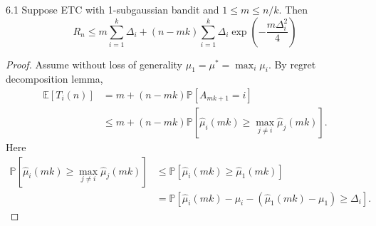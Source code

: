 \documentclass[10pt]{article}
\newenvironment{theorem*}[1]{%
  \IfBlankTF{#1}
    {\renewcommand{\themanualtheoreminner}{\unskip}}
    {\renewcommand\themanualtheoreminner{#1}}%
  \manualtheoreminner
}{\endmanualtheoreminner}
\theoremstyle{definition}
\begin{document}
\begin{theorem*}{6.1}
    Suppose ETC with 1-subgaussian bandit and $1 \leq m \leq n/k$.
    Then
    \begin{equation*}
        R_n \leq m \sum_{i=1}^{k} \Delta_i + (n-mk)\sum_{i=1}^{k} \Delta_i \exp\left(-\frac{m \Delta_i^2}{4}\right)
    \end{equation*}
\end{theorem*}

\begin{proof}
    Assume without loss of generality $\mu_1 = \mu^* = \max_i \mu_i$. By regret decomposition lemma,
    \begin{align*}
        \mathbb{E}[T_i (n)] &= m+ (n-mk) \mathbb{P}[A_{mk+1} = i] \\
        &\leq m+(n-mk)\mathbb{P}\left[\hat{\mu}_i (mk) \geq \max_{j \neq i} \hat{\mu}_j (mk) \right].
    \end{align*}
    Here
    \begin{align*}
        \mathbb{P}\left[\hat{\mu}_i (mk) \geq \max_{j \neq i} \hat{\mu}_j (mk) \right] &\leq \mathbb{P} \left[\hat{\mu}_i (mk) \geq \hat{\mu}_1(mk)\right] \\
        &= \mathbb{P}\left[\hat{\mu}_i (mk) -\mu_i - (\hat{\mu}_1 (mk) -\mu_1) \geq \Delta_i \right].
    \end{align*}

\end{proof}
\end{document}
